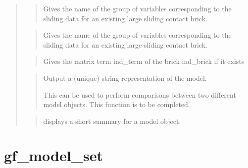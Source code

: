 \documentclass[a4paper,11pt,english]{sphinxmanual}
\begin{document}
\begin{quote}
\sphinxAtStartPar
{}
\begin{quote}

\sphinxAtStartPar
Gives the name of the group of variables corresponding to the
sliding data for an existing large sliding contact brick.
\end{quote}

\sphinxAtStartPar
{}
\begin{quote}

\sphinxAtStartPar
Gives the name of the group of variables corresponding to the
sliding data for an existing large sliding contact brick.
\end{quote}

\sphinxAtStartPar
{}
\begin{quote}

\sphinxAtStartPar
Gives the matrix term ind\_term of the brick ind\_brick if it exists
\end{quote}

\sphinxAtStartPar
{}
\begin{quote}

\sphinxAtStartPar
Output a (unique) string representation of the model.

\sphinxAtStartPar
This can be used to perform comparisons between two
different model objects.
This function is to be completed.
\end{quote}

\sphinxAtStartPar
{}
\begin{quote}

\sphinxAtStartPar
displays a short summary for a model object.
\end{quote}
\end{quote}


\section{gf\_model\_set}
\label{\detokenize{matlab_octave/cmdref_gf_model_set:gf-model-set}}\label{\detokenize{matlab_octave/cmdref_gf_model_set::doc}}
\sphinxAtStartPar
{}
\end{document}
